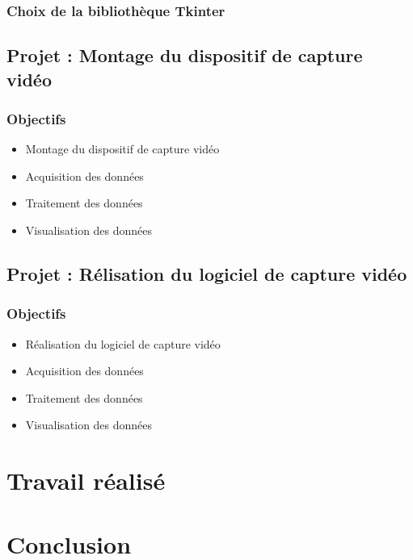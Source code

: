 \documentclass[a4paper, 11pt]{report}
\begin{document}
        \subsection{Choix de la bibliothèque Tkinter}
        \section{Projet : Montage du dispositif de capture vidéo}
      
        \subsection{Objectifs}
            \begin{itemize}
                \item Montage du dispositif de capture vidéo
                \item Acquisition des données
                \item Traitement des données
                \item Visualisation des données
            \end{itemize}
    

    \section{Projet : Rélisation du logiciel de capture vidéo}
        \subsection{Objectifs}
            \begin{itemize}
                \item Réalisation du logiciel de capture vidéo
                \item Acquisition des données
                \item Traitement des données
                \item Visualisation des données
            \end{itemize}

\chapter{Travail réalisé}
\minitoc      

\chapter{Conclusion}
\minitoc      
\end{document}
